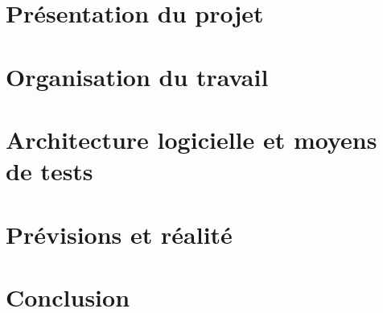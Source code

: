 \documentclass[a4paper,11pt]{article}
\begin{document}
\pagestyle{plain}


\selectfont

\makeTitlePage %

\clearpage
{}\selectfont

\begin{Large}
\tableofcontents
\end{Large}

\clearpage

\section{Présentation du projet}


\section{Organisation du travail}


\section{Architecture logicielle et moyens de tests}


\section{Prévisions et réalité}


\section{Conclusion}


\makeAbstractPage
\pagestyle{empty}
\end{document}
